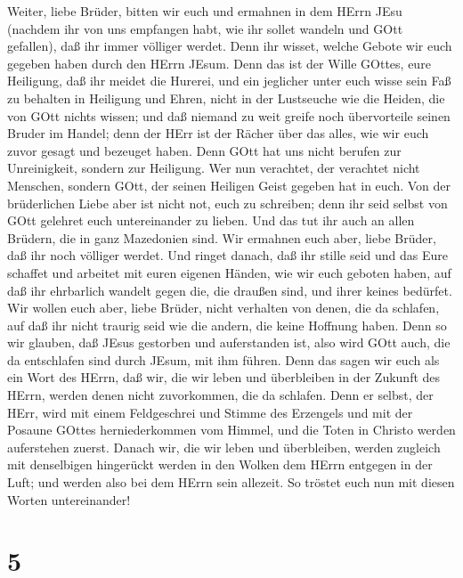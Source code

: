  Weiter, liebe Brüder, bitten wir euch und ermahnen in dem
HErrn JEsu (nachdem ihr von uns empfangen habt, wie ihr sollet wandeln
und GOtt gefallen), daß ihr immer völliger werdet.  Denn ihr
wisset, welche Gebote wir euch gegeben haben durch den HErrn JEsum.
 Denn das ist der Wille GOttes, eure Heiligung, daß ihr
meidet die Hurerei,  und ein jeglicher unter euch wisse sein
Faß zu behalten in Heiligung und Ehren,  nicht in der
Lustseuche wie die Heiden, die von GOtt nichts wissen;  und
daß niemand zu weit greife noch übervorteile seinen Bruder im Handel;
denn der HErr ist der Rächer über das alles, wie wir euch zuvor gesagt
und bezeuget haben.  Denn GOtt hat uns nicht berufen zur
Unreinigkeit, sondern zur Heiligung.  Wer nun verachtet, der
verachtet nicht Menschen, sondern GOtt, der seinen Heiligen Geist
gegeben hat in euch.  Von der brüderlichen Liebe aber ist
nicht not, euch zu schreiben; denn ihr seid selbst von GOtt gelehret
euch untereinander zu lieben.  Und das tut ihr auch an
allen Brüdern, die in ganz Mazedonien sind. Wir ermahnen euch aber,
liebe Brüder, daß ihr noch völliger werdet.  Und ringet
danach, daß ihr stille seid und das Eure schaffet und arbeitet mit euren
eigenen Händen, wie wir euch geboten haben,  auf daß ihr
ehrbarlich wandelt gegen die, die draußen sind, und ihrer keines
bedürfet.  Wir wollen euch aber, liebe Brüder, nicht
verhalten von denen, die da schlafen, auf daß ihr nicht traurig seid wie
die andern, die keine Hoffnung haben.  Denn so wir glauben,
daß JEsus gestorben und auferstanden ist, also wird GOtt auch, die da
entschlafen sind durch JEsum, mit ihm führen.  Denn das
sagen wir euch als ein Wort des HErrn, daß wir, die wir leben und
überbleiben in der Zukunft des HErrn, werden denen nicht zuvorkommen,
die da schlafen.  Denn er selbst, der HErr, wird mit einem
Feldgeschrei und Stimme des Erzengels und mit der Posaune GOttes
herniederkommen vom Himmel, und die Toten in Christo werden auferstehen
zuerst.  Danach wir, die wir leben und überbleiben, werden
zugleich mit denselbigen hingerückt werden in den Wolken dem HErrn
entgegen in der Luft; und werden also bei dem HErrn sein allezeit.
 So tröstet euch nun mit diesen Worten untereinander!

\hypertarget{section-4}{%
\section{5}\label{section-4}}

